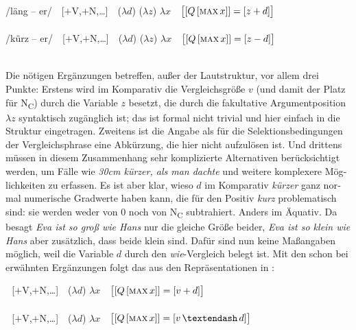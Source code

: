 \documentclass[output=paper,colorlinks,citecolor=brown]{langscibook}
\begin{document}
\begin{otherlanguage}{german}
\ea
\ea\gll 
{/läng -- er/} \,\, [$+$V,$+$N,\dots] \,\, ($\lambda d$) ($\lambda z$) {$\lambda x$} \,\, {$\big\lbrack [ Q\, [\textsc{max}\, x ]] = [z + d ] \big\rbrack$} \\
{} {} {} {} {} \phantom{(}{\small als} {} {} {} {} \\ 
\ex\gll 
{/kürz -- er/} \,\, [$+$V,$+$N,\dots] \,\, ($\lambda d$) ($\lambda z$) {$\lambda x$} \,\, {$\big\lbrack [ Q\, [\textsc{max}\, x ]] = [z - d ] \big\rbrack$} \\
{} {} {} {} {} \phantom{(}{\small als} {} {} {} {} \\ 
\z
\label{ex:19}
\z 

\noindent Die nötigen Ergänzungen betreffen, außer der Lautstruktur, vor allem drei Punkte: Erstens wird im Komparativ die Vergleichsgröße $v$ (und damit der Platz für N\textsubscript{C}) durch die Variable $z$ besetzt, die durch die fakultative Argumentposition $\lambda z$ syntaktisch zugänglich ist; das ist formal nicht trivial und hier einfach in die Struktur eingetragen. Zweitens ist die Angabe \glq als\grq{} für die Selektionsbedingungen der Vergleichsphrase eine Abkürzung, die hier nicht aufzulösen ist. Und drittens müssen in diesem Zusammenhang sehr komplizierte Alternativen berücksichtigt werden, um Fälle wie \textit{30cm kürzer, als man dachte} und weitere komplexere Möglichkeiten zu erfassen. Es ist aber klar, wieso $d$ im Komparativ \textit{kürzer} ganz normal numerische Gradwerte haben kann, die für den Positiv \textit{kurz} problematisch sind: sie werden weder von 0 noch von N\textsubscript{C} subtrahiert. Anders im Äquativ. Da besagt \textit{Eva ist so groß wie Hans} nur die gleiche Größe beider, \textit{Eva ist so klein wie Hans} aber zusätzlich, dass beide klein sind. Dafür sind nun keine Maßangaben möglich, weil die Variable $d$ durch den \textit{wie}-Vergleich belegt ist. Mit den schon bei  erwähnten Ergänzungen folgt das aus den Repräsentationen in :

\ea
\ea{} \,\, [$+$V,$+$N,\dots] \,\, {($\lambda d$)} {$\lambda x$} \,\, {$\big\lbrack [ Q\, [ \textsc{max}\, x ] ] = [ v + d ] \big\rbrack$} \\
{} {} {} {} \phantom{(}{\small wie} {} {} {} \\ 
\ex{} \,\, [$+$V,$+$N,\dots] \,\, {($\lambda d$)} {$\lambda x$} \,\, {$\big\lbrack [ Q\, [ \textsc{max}\, x ] ] = [ v\, –\, d ] \big\rbrack$} \\
{} {} {} {} \phantom{(}{\small wie} {} {} {} \\ 
\z
\label{ex:20}
\z 


\end{otherlanguage}
\end{document}
